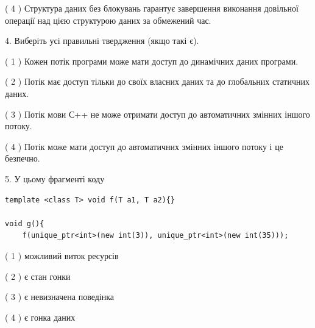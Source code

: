 \documentclass[12pt, ukrainian]{article}
\begin{document}
\begin {large}
{( 4 ) Структура даних без блокувань гарантує завершення виконання довільної операції над цією структурою даних за обмежений час.%


4. Виберіть усі правильні твердження (якщо такі є).\par
\vspace{2mm}

( 1 ) Кожен потік програми може мати доступ до динамічних даних програми.%

( 2 ) Потік має доступ тільки до своїх власних даних та до глобальних статичних даних.%

( 3 ) Потік мови С++ не може отримати доступ до автоматичних змінних іншого потоку.%

( 4 ) Потік може мати доступ до автоматичних змінних іншого потоку і це безпечно.%


5. У цьому фрагменті коду
\begin{verbatim}
template <class T> void f(T a1, T a2){}

void g(){
    f(unique_ptr<int>(new int(3)), unique_ptr<int>(new int(35)));
\end{verbatim}

( 1 ) можливий виток ресурсів%

( 2 ) є стан гонки%

( 3 ) є невизначена поведінка%

( 4 ) є гонка даних%
}
\end {large}
\end{document}
